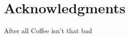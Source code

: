 \documentclass{sig-alternate}
\begin{document}
\section{Acknowledgments}

After all Coffee isn't that bad 

%

%
%
\end{document}
